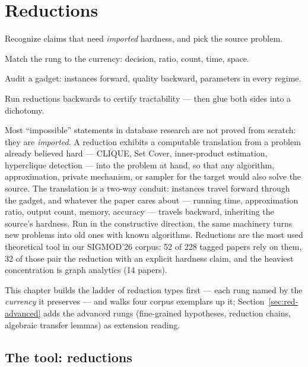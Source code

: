 \chapter{Reductions}
\setcounter{section}{-1}   %
\label{ch:reduction}

\begin{objectives}
\item Recognize claims that need \emph{imported} hardness, and pick the source problem.
\item Match the rung to the currency: decision, ratio, count, time, space.
\item Audit a gadget: instances forward, quality backward, parameters in every regime.
\item Run reductions backwards to certify tractability --- then glue both sides into a dichotomy.
\end{objectives}

Most ``impossible'' statements in database research are not proved from scratch: they are
\emph{imported}. A reduction exhibits a computable translation from a problem already
believed hard --- CLIQUE, Set Cover, inner-product estimation, hyperclique detection ---
into the problem at hand, so that any algorithm, approximation, private mechanism, or
sampler for the target would also solve the source. The translation is a two-way conduit:
instances travel forward through the gadget, and whatever the paper cares about --- running
time, approximation ratio, output count, memory, accuracy --- travels backward, inheriting
the source's hardness. Run in the constructive direction, the same machinery turns new
problems into old ones with known algorithms. Reductions are the most used theoretical
tool in our SIGMOD'26 corpus: 52 of 228 tagged papers rely on them, 32 of those pair the
reduction with an explicit hardness claim, and the heaviest concentration is graph
analytics (14 papers).

This chapter builds the ladder of reduction types first --- each rung named by the
\emph{currency} it preserves --- and walks four corpus exemplars up it;
Section~\ref{sec:red-advanced} adds the advanced rungs (fine-grained hypotheses,
reduction chains, algebraic transfer lemmas) as extension reading.

\section{The tool: reductions}
\label{sec:red-tool}

